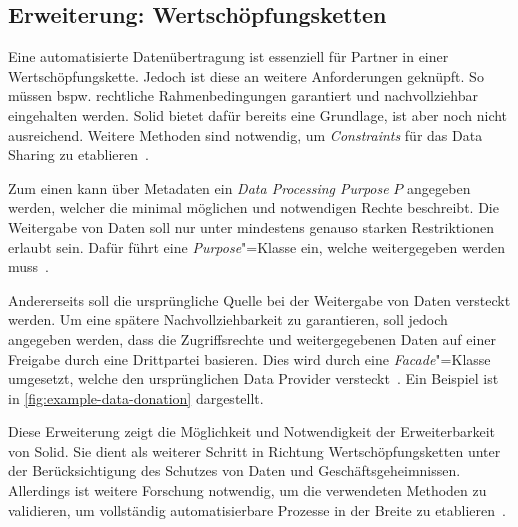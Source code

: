 \subsection{Erweiterung: Wertschöpfungsketten}

Eine automatisierte Datenübertragung ist essenziell für Partner in einer Wertschöpfungskette.
Jedoch ist diese an weitere Anforderungen geknüpft.
So müssen bspw. rechtliche Rahmenbedingungen garantiert und nachvollziehbar eingehalten werden.
Solid bietet dafür bereits eine Grundlage, ist aber noch nicht ausreichend.
Weitere Methoden sind notwendig, um \emph{Constraints} für das Data Sharing zu etablieren~\cite{bothSolidBasedB2BData2025}.

Zum einen kann über Metadaten ein \emph{Data Processing Purpose} $P$ angegeben werden, welcher die minimal möglichen und notwendigen Rechte beschreibt.
Die Weitergabe von Daten soll nur unter mindestens genauso starken Restriktionen erlaubt sein.
Dafür führt \cite{bothSolidBasedB2BData2025} eine \emph{Purpose}"=Klasse ein, welche weitergegeben werden muss~\cite{bothSolidBasedB2BData2025}.

Andererseits soll die ursprüngliche Quelle bei der Weitergabe von Daten versteckt werden.
Um eine spätere Nachvollziehbarkeit zu garantieren, soll jedoch angegeben werden, dass die Zugriffsrechte und weitergegebenen Daten auf einer Freigabe durch eine Drittpartei basieren.
Dies wird durch eine \emph{Facade}"=Klasse umgesetzt, welche den ursprünglichen Data Provider versteckt~\cite{bothSolidBasedB2BData2025}. Ein Beispiel ist in \autoref{fig:example-data-donation} dargestellt.

Diese Erweiterung zeigt die Möglichkeit und Notwendigkeit der Erweiterbarkeit von Solid.
Sie dient als weiterer Schritt in Richtung Wertschöpfungsketten unter der Berücksichtigung des Schutzes von Daten und Geschäftsgeheimnissen.
Allerdings ist weitere Forschung notwendig, um die verwendeten Methoden zu validieren, um vollständig automatisierbare Prozesse in der Breite zu etablieren~\cite{bothSolidBasedB2BData2025}.
